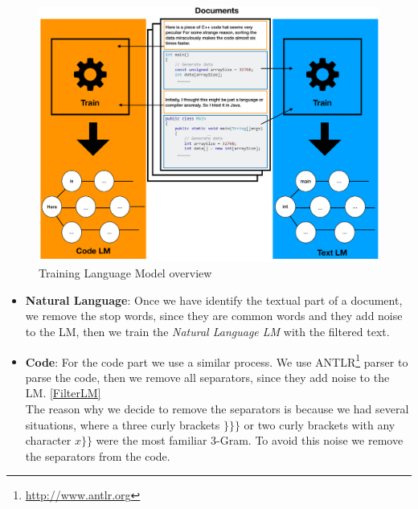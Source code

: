 \documentclass[12pt,mscthesis]{usiinfthesis}
\begin{document}
	\begin{figure}[htbp]
	\centering
	\includegraphics[width=\textwidth]{trainingLm}
	\caption{Training Language Model overview}
	\label{trainingLm}
	\end{figure}


	\begin{itemize}
		\item \textbf{Natural Language}: Once we have identify the textual part  of a document, we remove the stop words, since they are common words and they add noise to the LM, then we train the \emph{Natural Language LM} with the filtered text.
		\item \textbf{Code}: For the code part we use a similar process. We use ANTLR\footnote{\url{http://www.antlr.org}} parser to parse the code, then we remove all separators, since they add noise to the LM. \cref{FilterLM}\\
		The reason why we decide to remove the separators is because we had several situations, where a three curly brackets $\}\}\}$ or two curly brackets with any character $x\}\}$ were the most familiar 3-Gram. To avoid this noise we remove the separators from the code.
	\end{itemize}
	
\end{document}
